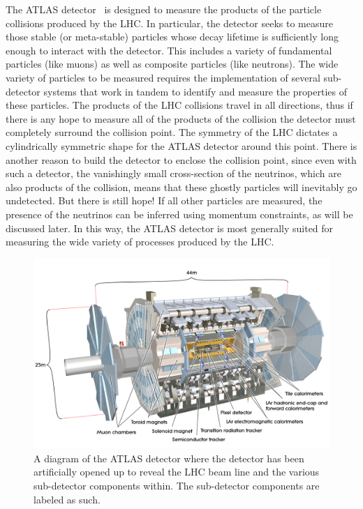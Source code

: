 


The ATLAS detector~\cite{ATLAS} is designed to measure
the products of the particle collisions produced by the LHC.
In particular, the detector seeks to measure those stable 
(or meta-stable) particles whose decay lifetime is sufficiently
long enough to interact with the detector.  This includes
a variety of fundamental particles (like muons) as well as 
composite particles (like neutrons). The wide variety of 
particles to be measured requires the implementation
of several sub-detector systems that work in tandem 
to identify and measure the properties of these particles.
The products of the LHC collisions travel in all directions, 
thus if there is any hope to measure all of the products of the collision
the detector must completely surround the collision point. 
The symmetry of the LHC dictates a cylindrically symmetric
shape for the ATLAS detector around this point.
There is another reason to build the detector to enclose
the collision point, since 
even with such a detector, the vanishingly small
cross-section of the neutrinos, which are also products
of the collision, means that these ghostly particles
will inevitably go undetected. But there is still hope!
If all other particles are measured, 
the presence of the neutrinos can be inferred 
using momentum constraints, as will be discussed later.  
In this way, the ATLAS detector is most generally suited
for measuring the wide variety of processes produced
by the LHC. 

\begin{figure}[ht!]
\centering
\includegraphics[width=.9\textwidth]{figures/atlas/detector.jpg}
\caption{A diagram of the ATLAS detector where the detector has
been artificially opened up to reveal the LHC beam line and the
various sub-detector components within. The sub-detector components
are labeled as such.}
\label{fig:atlas}
\end{figure}

